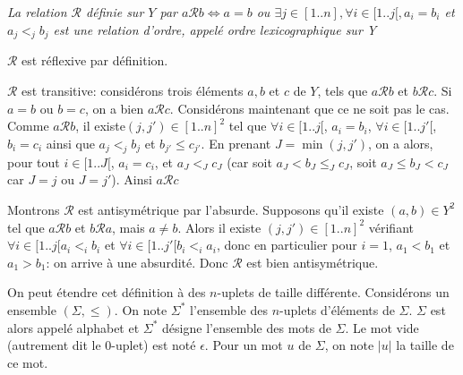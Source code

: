 \documentclass{scrartcl}
\begin{document}
			\prop \textsl{La relation $\mathcal{R}$ définie sur $Y$ par 
				$a\mathcal{R}b \Leftrightarrow a=b$ ou $\exists j \in [1..n], \forall i \in [1..j[, a_i = b_i$ et
				$a_j <_j b_j$
				est une relation d'ordre, appelé ordre lexicographique sur Y}
			\begin{demo}
				\item $\mathcal{R}$ est réflexive par définition.
				\item $\mathcal{R}$ est transitive: considérons trois éléments $a,b$ et $c$ de $Y$,
					tels que $a\mathcal{R}b$ et $b\mathcal{R}c$. Si $a=b$ ou $b=c$, on a bien $a\mathcal{R}c$.
					Considérons maintenant que ce ne soit pas le cas. Comme $a\mathcal{R}b$, il existe$(j,j')\in[1..n]^2$ tel que 
					$\forall i \in [1..j[$, $a_i = b_i$, $\forall i \in [1..j'[$, $b_i=c_i$ ainsi que $a_j <_j b_j$ et $b_{j'} \leq c_{j'}$.
					En prenant $J = \min(j,j')$, on a alors, pour tout $i \in [1..J[$, $a_i = c_i$, et $a_J <_J c_J$ 
					(car soit $a_J < b_J \leq_J c_J$, soit $a_J \leq b_J < c_J$ car $J = j$ ou $J = j'$).
					Ainsi $a\mathcal{R}c$
				\item Montrons $\mathcal{R}$ est antisymétrique par l'absurde.
					Supposons qu'il existe $(a,b)\in Y^2$ tel que $a\mathcal{R}b$ et $b\mathcal{R}a$, mais $a\neq b$.
					Alors il existe $(j,j')\in[1..n]^2$ vérifiant $\forall i \in [1..j[ a_i <_i b_i$ et $\forall i \in [1..j'[ b_i <_i a_i$,
					donc en particulier pour $i=1$, $a_1 < b_1$ et $a_1 > b_1$: on arrive à une absurdité.
					Donc $\mathcal{R}$ est bien antisymétrique.
			\end{demo}

			On peut étendre cet définition à des $n$-uplets de taille différente. Considérons un ensemble $(\Sigma,\leq)$.
			On note $\Sigma^*$ l'ensemble des $n$-uplets d'éléments de $\Sigma$. 
			$\Sigma$ est alors appelé alphabet et $\Sigma^*$ désigne l'ensemble des mots de $\Sigma$.
			Le mot vide (autrement dit le 0-uplet) est noté $\epsilon$.
			Pour un mot $u$ de $\Sigma$, on note $|u|$ la taille de ce mot.
\end{document}
